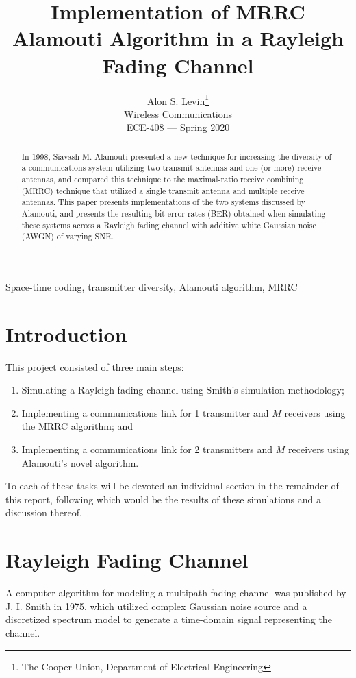 \documentclass[journal]{IEEEtran}
\begin{document}
\title{Implementation of MRRC Alamouti Algorithm in a Rayleigh Fading Channel}
\author{Alon S. Levin\thanks{The Cooper Union, Department of Electrical Engineering}\\Wireless Communications\\ECE-408 --- Spring 2020}
\maketitle

\begin{abstract}
In 1998, Siavash M. Alamouti presented a new technique for increasing the diversity of a communications system utilizing two transmit antennas and one (or more) receive antennas, and compared this technique to the maximal-ratio receive combining (MRRC) technique that utilized a single transmit antenna and multiple receive antennas. This paper presents implementations of the two systems discussed by Alamouti, and presents the resulting bit error rates (BER) obtained when simulating these systems across a Rayleigh fading channel with additive white Gaussian noise (AWGN) of varying SNR.
\end{abstract}

\begin{IEEEkeywords}
Space-time coding, transmitter diversity, Alamouti algorithm, MRRC
\end{IEEEkeywords}

\section{Introduction}\label{sec:intro}
This project consisted of three main steps:
\begin{enumerate}
\item Simulating a Rayleigh fading channel using Smith's simulation methodology;
\item Implementing a communications link for 1 transmitter and $M$ receivers using the MRRC algorithm; and
\item Implementing a communications link for 2 transmitters and $M$ receivers using Alamouti's novel algorithm.
\end{enumerate}
To each of these tasks will be devoted an individual section in the remainder of this report, following which would be the results of these simulations and a discussion thereof.


\section{Rayleigh Fading Channel} \label{sec:channel}
A computer algorithm for modeling a multipath fading channel was published by J. I. Smith in 1975, which utilized  complex Gaussian noise source and a discretized spectrum model to generate a time-domain signal representing the channel. 
\end{document}

